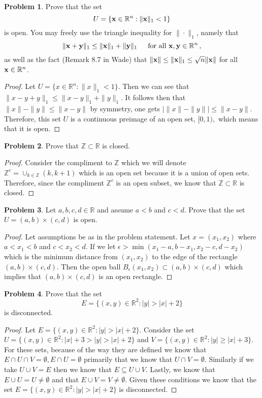 \documentclass[11pt]{article}
\theoremstyle{definition}
\newtheorem{problem}{Problem}
\newcommand{\R}{\mathbb{R}}
\newcommand{\Z}{\mathbb{Z}}
\newcommand{\bx}{{\bf x}}
\begin{document}
\pagebreak
\begin{problem}
Prove that the set
\[
U = \{ \bx \in \R^n : \| \bx \|_1 < 1\}
\]
is open. You may freely use the triangle inequality for $\| \cdot \|_1$, namely that
\[
\| \bx + {\bf y} \|_1 \leq \| \bx\|_1 + \| {\bf y}\|_1 \, \quad \text{ for all } \bx, {\bf y} \in \R^n \, , 
\]
as well as the fact (Remark 8.7 in Wade) that $\| \bx \| \leq \| \bx\|_1 \leq \sqrt{n} \| \bx\|$ for all $\bx \in \R^n$. 
\end{problem}

\begin{proof}
Let $U = \{x \in \R^n: \|x\|_1 < 1\}$. Then we can see that $\|x - y + y\|_1 \leq \|x - y\|_1 + \|y\|_1$. It follows then that $\|x\| - \|y\|\leq \|x-y\|$ by symmetry, one gets $|\|x\|-\|y\|| \leq \|x-y\|$. Therefore, this set $U$ is a continuous preimage of an open set, $[0, 1),$ which means that it is open.
\end{proof}

\pagebreak
\begin{problem}
Prove that $\Z \subset \R$ is closed. 
\end{problem}

\begin{proof}
Consider the compliment to $\Z$ which we will denote $\Z^c = \cup_{k\in \Z}(k, k+1)$ which is an open set because it is a union of open sets. Therefore, since the compliment $\Z^c$ is an open subset, we know that $\Z \subset \R$ is closed.
\end{proof}

\pagebreak
\begin{problem}
	Let $a,b,c,d \in \R$ and assume $a < b$ and $c < d$. Prove that the set $U = (a,b) \times (c,d)$ is open. 
\end{problem}

\begin{proof}
Let assumptions be as in the problem statement. Let $x = (x_1, x_2)$ where $a < x_1 < b$ and $c < x_2 < d$. If we let $\epsilon >  \min(x_1 - a, b - x_1, x_2 - c, d - x_2)$ which is the minimum distance from $(x_1, x_2)$ to the edge of the rectangle $(a, b) \times (c, d)$. Then the open ball $B_{\epsilon}(x_1, x_2) \subset (a, b) \times (c, d)$ which implies that $(a, b)\times (c, d)$ is an open rectangle.
\end{proof}

\pagebreak
\begin{problem}
Prove that the set 
\[
E = \{ (x,y) \in \R^2 : |y| > |x| + 2\}
\]
is disconnected. 
\end{problem}

\begin{proof}
Let $E = \{(x, y) \in \R^2: |y| > |x| + 2\}$. Consider the set $U = \{(x, y) \in \R^2: |x| + 3 > |y| > |x| + 2\}$ and $V = \{(x, y) \in \R^2: |y| \geq |x| + 3\}$. For these sets, because of the way they are defined we know that $E \cap U \cap V = \emptyset, E \cap U = \emptyset$ primarily that we know that $U \cap V = \emptyset.$ Similarly if we take $U \cup V = E$ then we know that $E \subseteq U \cup V$. Lastly, we know that $E\cup U = U \neq \emptyset$ and that $E \cup V = V \neq \emptyset.$ Given these conditions we know that the set $E = \{(x, y) \in \R^2: |y| > |x| + 2\}$ is disconnected.
\end{proof}
\end{document}
